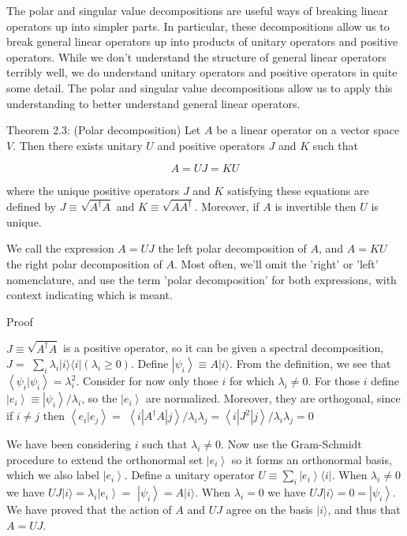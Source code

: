 The polar and singular value decompositions are useful ways of breaking linear operators up into simpler parts. In particular, these decompositions allow us to break general linear operators up into products of unitary operators and positive operators. While we don't understand the structure of general linear operators terribly well, we do understand unitary operators and positive operators in quite some detail. The polar and singular value decompositions allow us to apply this understanding to better understand general linear operators.

Theorem 2.3: (Polar decomposition) Let $A$ be a linear operator on a vector space $V$. Then there exists unitary $U$ and positive operators $J$ and $K$ such that

$$
A=U J=K U
$$

where the unique positive operators $J$ and $K$ satisfying these equations are defined by $J \equiv \sqrt{A^{\dagger} A}$ and $K \equiv \sqrt{A A^{\dagger}}$. Moreover, if $A$ is invertible then $U$ is unique.

We call the expression $A=U J$ the left polar decomposition of $A$, and $A=K U$ the right polar decomposition of $A$. Most often, we'll omit the 'right' or 'left' nomenclature, and use the term 'polar decomposition' for both expressions, with context indicating which is meant.

Proof

$J \equiv \sqrt{A^{\dagger} A}$ is a positive operator, so it can be given a spectral decomposition, $J=$ $\sum_{i} \lambda_{i}|i\rangle\langle i|\left(\lambda_{i} \geq 0\right)$. Define $\left|\psi_{i}\right\rangle \equiv A|i\rangle$. From the definition, we see that $\left\langle\psi_{i} | \psi_{i}\right\rangle=\lambda_{i}^{2}$. Consider for now only those $i$ for which $\lambda_{i} \neq 0$. For those $i$ define $\left|e_{i}\right\rangle \equiv\left|\psi_{i}\right\rangle / \lambda_{i}$, so the $\left|e_{i}\right\rangle$ are normalized. Moreover, they are orthogonal, since if $i \neq j$ then $\left\langle e_{i} | e_{j}\right\rangle=$ $\left\langle i\left|A^{\dagger} A\right| j\right\rangle / \lambda_{i} \lambda_{j}=\left\langle i\left|J^{2}\right| j\right\rangle / \lambda_{i} \lambda_{j}=0$

We have been considering $i$ such that $\lambda_{i} \neq 0$. Now use the Gram-Schmidt procedure to extend the orthonormal set $\left|e_{i}\right\rangle$ so it forms an orthonormal basis, which we also label $\left|e_{i}\right\rangle$. Define a unitary operator $U \equiv \sum_{i}\left|e_{i}\right\rangle\langle i|$. When $\lambda_{i} \neq 0$ we have $U J|i\rangle=\lambda_{i}\left|e_{i}\right\rangle=$ $\left|\psi_{i}\right\rangle=A|i\rangle$. When $\lambda_{i}=0$ we have $U J|i\rangle=0=\left|\psi_{i}\right\rangle$. We have proved that the action of $A$ and $U J$ agree on the basis $|i\rangle$, and thus that $A=U J$.

